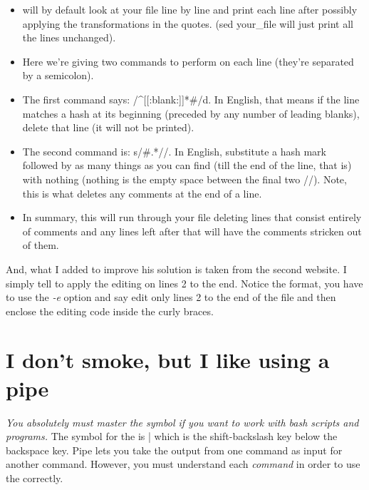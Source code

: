 \begin{itemize}
\item {} will by default look at your file line by line and print each line after possibly applying the transformations in the quotes. (sed \tqs{} your\_file will just print all the lines unchanged).

\item Here we're giving  two commands to perform on each line (they're separated by a semicolon).

\item The first command says: /\textasciicircum{}[[:blank:]]*\#/d. In English, that means if the line matches a hash at its beginning (preceded by any number of leading blanks), delete that line (it will not be printed).

\item The second command is: s/\#.*//. In English, substitute a hash mark followed by as many things as you can find (till the end of the line, that is) with nothing (nothing is the empty space between the final two //). Note, this is what deletes any comments at the end of a line.

\item In summary, this will run through your file deleting lines that consist entirely of comments and any lines left after that will have the comments stricken out of them.
\end{itemize}

And, what I added to improve his solution is taken from the second website. I simply tell  to apply the editing on lines 2 to the end. Notice the format, you have to use the \emph{-e} option and say edit only lines 2 to the end of the file and then enclose the editing code inside the curly braces.

\section{I don't smoke, but I like using a pipe}

\textit{You absolutely must master the  symbol if you want to work with bash scripts and programs.} The symbol for the  is | which is the shift-backslash key below the backspace key. Pipe lets you take the output from one command as input for another command. However, you must understand each \emph{command} in order to use the  correctly. 

